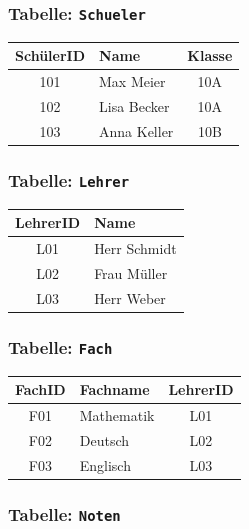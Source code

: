 \documentclass[a4paper,12pt]{article}
\begin{document}
		\subsubsection*{Tabelle: \texttt{Schueler}}
		
		\begin{tabular}{|c|l|c|}
			\hline
			\textbf{SchülerID} & \textbf{Name} & \textbf{Klasse} \\
			\hline
			101 & Max Meier & 10A \\
			102 & Lisa Becker & 10A \\
			103 & Anna Keller & 10B \\
			\hline
		\end{tabular}
		
		\vspace{1em}
		\subsubsection*{Tabelle: \texttt{Lehrer}}
		
		\begin{tabular}{|c|l|}
			\hline
			\textbf{LehrerID} & \textbf{Name} \\
			\hline
			L01 & Herr Schmidt \\
			L02 & Frau Müller \\
			L03 & Herr Weber \\
			\hline
		\end{tabular}
		
		\vspace{1em}
		\subsubsection*{Tabelle: \texttt{Fach}}
		
		\begin{tabular}{|c|l|c|}
			\hline
			\textbf{FachID} & \textbf{Fachname} & \textbf{LehrerID} \\
			\hline
			F01 & Mathematik & L01 \\
			F02 & Deutsch & L02 \\
			F03 & Englisch & L03 \\
			\hline
		\end{tabular}
		
		\vspace{1em}
		\subsubsection*{Tabelle: \texttt{Noten}}
		
\end{document}
